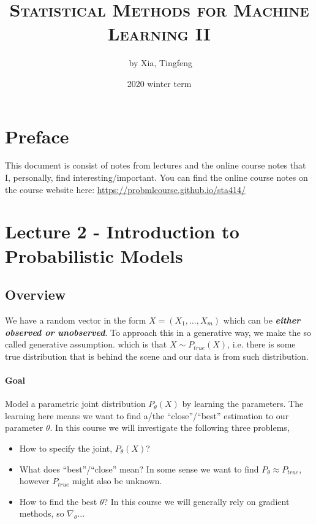 \documentclass[11pt]{article}
\author{\ccLogo \,\,by Xia, Tingfeng}
\title{\textsc{Statistical Methods for Machine Learning II}}
\date{2020 winter term}
\begin{document}
\maketitle
\doclicenseThis

\section*{Preface} 
This document is consist of notes from lectures and the online course notes that I, personally, find interesting/important. You can find the online course notes on the course website here: \url{https://probmlcourse.github.io/sta414/}

\tableofcontents

\newpage

\section{Lecture 2 - Introduction to Probabilistic Models}
\subsection{Overview}
We have a random vector in the form $X = (X_1,\dots,X_m)$ which can be \textit{\textbf{either observed or unobserved}}. To approach this in a generative way, we make the so called generative assumption. which is that $X\sim P_{true}(X)$, i.e. there is some true distribution that is behind the scene and our data is from such distribution. 

\paragraph{Goal} Model a parametric joint distribution $P_\theta (X)$ by learning the parameters. The learning here means we want to find a/the ``close''/``best'' estimation to our parameter $\theta$. In this course we will investigate the following three problems,
\begin{itemize}
    \item How to specify the joint, $P_\theta(X)$?
    \item What does ``best''/``close'' mean? In some sense we want to find $P_\theta \approx P_{true}$, however $P_{true}$ might also be unknown.
    \item How to find the best $\theta$? In this course we will generally rely on gradient methods, so $\nabla_\theta$...
\end{itemize}
\end{document}
